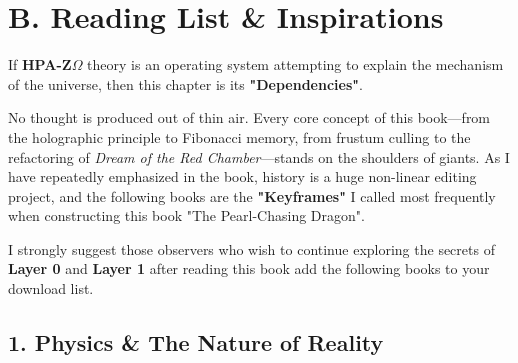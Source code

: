 \section*{B. Reading List \& Inspirations}

If \textbf{HPA-Z$\Omega$} theory is an operating system attempting to explain the mechanism of the universe, then this chapter is its \textbf{"Dependencies"}.

No thought is produced out of thin air. Every core concept of this book—from the holographic principle to Fibonacci memory, from frustum culling to the refactoring of \textit{Dream of the Red Chamber}—stands on the shoulders of giants. As I have repeatedly emphasized in the book, history is a huge non-linear editing project, and the following books are the \textbf{"Keyframes"} I called most frequently when constructing this book "The Pearl-Chasing Dragon".

I strongly suggest those observers who wish to continue exploring the secrets of \textbf{Layer 0} and \textbf{Layer 1} after reading this book add the following books to your download list.

\subsection*{1. Physics \& The Nature of Reality}

